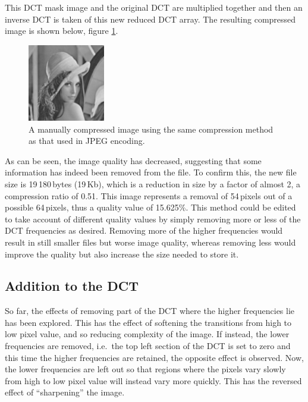 This DCT mask image and the original DCT are multiplied together and then an inverse DCT is taken of this new reduced DCT array. The resulting compressed image is shown below, figure \ref{fig:mancompresslena}.
\begin{figure}[ht]
	\centering
	\includegraphics[width=0.3\textwidth]{lena_manual_compression.jpg}
	\caption{A manually compressed image using the same compression method as that used in JPEG encoding.\label{fig:mancompresslena}}
\end{figure}

As can be seen, the image quality has decreased, suggesting that some information has indeed been removed from the file. To confirm this, the new file size is 19\,180\,bytes (19\,Kb), which is a reduction in size by a factor of almost 2, a compression ratio of 0.51. This image represents a removal of 54\,pixels out of a possible 64\,pixels, thus a quality value of 15.625\%. This method could be edited to take account of different quality values by simply removing more or less of the DCT frequencies as desired. Removing more of the higher frequencies would result in still smaller files but worse image quality, whereas removing less would improve the quality but also increase the size needed to store it.

\subsection{Addition to the DCT} %
\label{sub:addition_to_the_dct}
So far, the effects of removing part of the DCT where the higher frequencies lie has been explored. This has the effect of softening the transitions from high to low pixel value, and so reducing complexity of the image. If instead, the lower frequencies are removed, i.e.\ the top left section of the DCT is set to zero and this time the higher frequencies are retained, the opposite effect is observed. Now, the lower frequencies are left out so that regions where the pixels vary slowly from high to low pixel value will instead vary more quickly. This has the reversed effect of ``sharpening'' the image.

